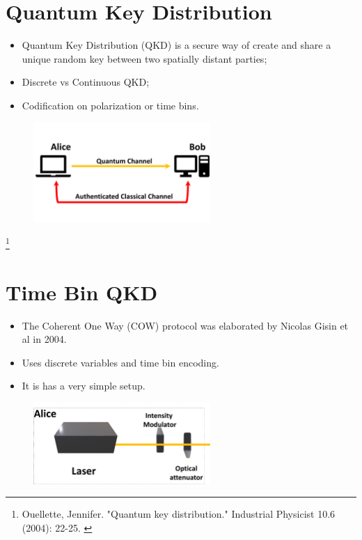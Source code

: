 \documentclass[1000pt]{article}
\newcommand{\mysection}[1]{\section*{\color{black}\sffamily #1}}%
\newcommand{\cref}[1]{{\fontsize{17pt}{0cm}\selectfont\color{black} #1}}%
\newcommand\blfootnote[1]{%
  \begingroup
  \renewcommand\thefootnote{}\footnote{#1}%
  \addtocounter{footnote}{-1}%
  \endgroup
}
\begin{document}
\mysection{\Huge\textbf{ Quantum Key Distribution}} \Large \vspace*{1cm}
\begin{itemize}
\item Quantum Key Distribution (QKD) is a secure way of create and share a unique random key between two spatially distant parties;
\item Discrete vs Continuous QKD;
\item Codification on polarization or time bins.
\end{itemize}
  \begin{figure}[hbt]
    	\centering
    	\includegraphics[width=0.6\textwidth]{./figures/Full.pdf}
    \end{figure}
       
\blfootnote{
\hspace*{12cm}
\begin{minipage}{26cm}
\cref{
Ouellette, Jennifer. "Quantum key distribution." Industrial Physicist 10.6 (2004): 22-25.
}
\end{minipage}

}
\mysection{\Huge\textbf{Time Bin QKD}} \Large \vspace*{1cm}
\begin{itemize}

\item The Coherent One Way (COW) protocol was elaborated by Nicolas Gisin et al in 2004. 

\item Uses discrete variables and time bin encoding.

\item It is has a very simple setup.
\end{itemize}
    \begin{figure}[hbt]
    	\centering
    	\includegraphics[width=0.6\textwidth]{./figures/A.pdf}
        	\label{bob}
    \end{figure}
    
\end{document}
